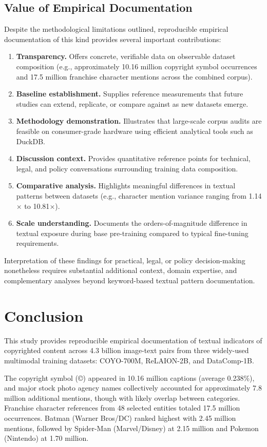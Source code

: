 \documentclass[11pt]{article}
\begin{document}
\subsection{Value of Empirical Documentation}
Despite the methodological limitations outlined, reproducible empirical documentation of this kind provides several important contributions:

\begin{enumerate}
\item \textbf{Transparency.} Offers concrete, verifiable data on observable dataset composition (e.g., approximately 10.16 million copyright symbol occurrences and 17.5 million franchise character mentions across the combined corpus).
\item \textbf{Baseline establishment.} Supplies reference measurements that future studies can extend, replicate, or compare against as new datasets emerge.
\item \textbf{Methodology demonstration.} Illustrates that large-scale corpus audits are feasible on consumer-grade hardware using efficient analytical tools such as DuckDB.
\item \textbf{Discussion context.} Provides quantitative reference points for technical, legal, and policy conversations surrounding training data composition.
\item \textbf{Comparative analysis.} Highlights meaningful differences in textual patterns between datasets (e.g., character mention variance ranging from 1.14$\times$ to 10.81$\times$).
\item \textbf{Scale understanding.} Documents the orders-of-magnitude difference in textual exposure during base pre-training compared to typical fine-tuning requirements.
\end{enumerate}

Interpretation of these findings for practical, legal, or policy decision-making nonetheless requires substantial additional context, domain expertise, and complementary analyses beyond keyword-based textual pattern documentation.

\section{Conclusion}
This study provides reproducible empirical documentation of textual indicators of copyrighted content across 4.3 billion image-text pairs from three widely-used multimodal training datasets: COYO-700M, ReLAION-2B, and DataComp-1B.

The copyright symbol (©) appeared in 10.16 million captions (average 0.238\%), and major stock photo agency names collectively accounted for approximately 7.8 million additional mentions, though with likely overlap between categories. Franchise character references from 48 selected entities totaled 17.5 million occurrences. Batman (Warner Bros/DC) ranked highest with 2.45 million mentions, followed by Spider-Man (Marvel/Disney) at 2.15 million and Pokemon (Nintendo) at 1.70 million.
\end{document}

